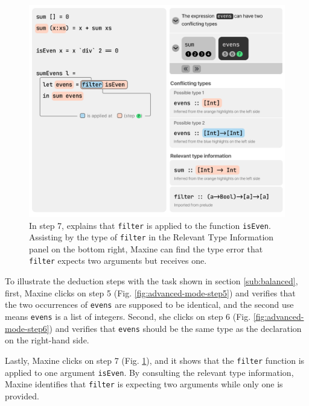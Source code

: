 \begin{figure}
        \centering
        \includegraphics[width=\linewidth,trim=0mm 8mm 0mm 0mm]{images/advanced-mode-3.pdf}
        \caption{
            In step 7, \chameleon{} 
            explains that \texttt{filter} is applied to 
            the function \texttt{isEven}. Assisting by 
            the type of \texttt{filter} in the 
            Relevant Type Information panel on the bottom
            right, Maxine can find the type error that 
            \texttt{filter} expects two arguments but receives one.
        }
        \label{fig:advanced-mode-step7}
\end{figure}


To illustrate the deduction steps with the task shown in section \ref{sub:balanced},  first, Maxine clicks on step 5 (Fig. \ref{fig:advanced-mode-step5}) and verifies
that the two occurrences of \texttt{evens} are supposed to be identical, and the
second use means \texttt{evens} is a list of integers. Second, she
clicks on step 6 (Fig. \ref{fig:advanced-mode-step6}) and verifies that
\texttt{evens} should be the same type as the declaration on the right-hand
side. 


Lastly, Maxine clicks on step 7 (Fig. \ref{fig:advanced-mode-step7}), and
it shows that the \texttt{filter} function is applied to one argument
\texttt{isEven}. By consulting the relevant type information, Maxine identifies
that \texttt{filter} is expecting two arguments while only one is provided. 

